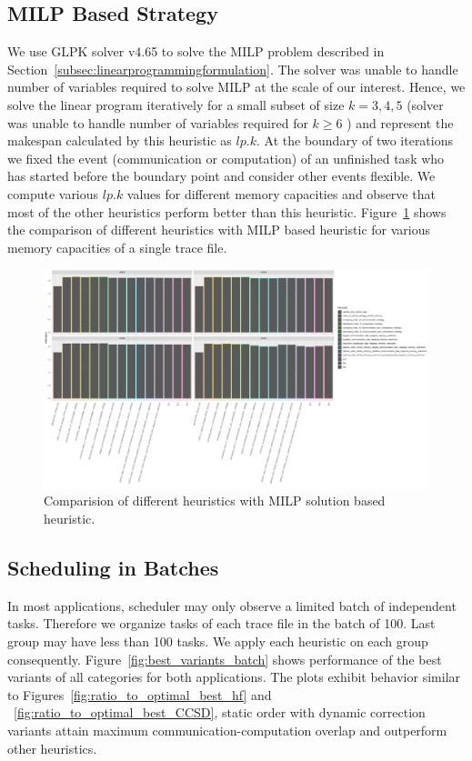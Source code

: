 \documentclass[runningheads]{llncs} %
\begin{document}
\subsection{MILP Based Strategy}
 We use GLPK solver v4.65 to solve the MILP problem described in Section~\ref{subsec:linearprogrammingformulation}. The solver was unable to handle number of variables required to solve MILP at the scale of our interest. Hence, we solve the linear program iteratively for a small subset of size $k=3,4,5$ (solver was unable to handle number of variables required for $k\ge6$ ) and represent the makespan calculated by this heuristic as $lp.k$. At the boundary of two iterations we fixed the event (communication or computation) of an unfinished task who has  started before the boundary point and consider other events flexible. We compute various  $lp.k$ values for different memory capacities and observe that most of the other heuristics perform better than this heuristic. Figure~\ref{fig:iterativeLpSolution} shows the comparison of different heuristics with MILP based heuristic for various memory capacities of a single trace file.

	\begin{figure}[htb]
	\includegraphics[scale=0.25]{../ExperimentalResults/makespan_with_lp.pdf}
	\caption{Comparision of different heuristics with MILP solution based heuristic.}
	\label{fig:iterativeLpSolution}
\end{figure}

\subsection{Scheduling in Batches}
In most applications, scheduler may only observe a limited batch of independent tasks. Therefore we organize tasks of each trace file in the batch of 100. Last group may have less than 100 tasks. We  apply each heuristic on each group consequently.  Figure~\ref{fig:best_variants_batch} shows performance of the best variants of all categories for both applications. The plots exhibit behavior similar to Figures~\ref{fig:ratio_to_optimal_best_hf} and ~\ref{fig:ratio_to_optimal_best_CCSD}, static order with dynamic correction variants attain maximum communication-computation overlap and outperform other heuristics.
\end{document}
